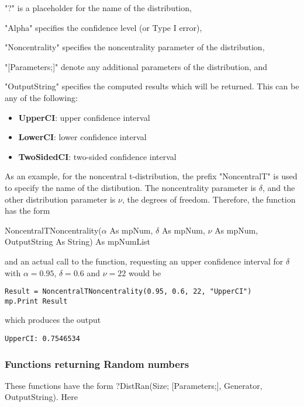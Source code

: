 "?" is a placeholder for the name of the distribution, 

"Alpha" specifies the confidence level (or Type I error), 

"Noncentrality" specifies the noncentrality parameter of the distribution, 

"[Parameters;]" denote any additional parameters of the distribution, and 

"OutputString" specifies the computed results which will be returned. This can be any of the following:

\begin{itemize}
	\item \textbf{UpperCI}: upper confidence interval
	\item \textbf{LowerCI}: lower confidence interval
	\item \textbf{TwoSidedCI}: two-sided confidence interval
\end{itemize}


\vspace{0.3cm}
As an example, for the noncentral  t-distribution, the prefix "NoncentralT" is used to specify the name of the distibution. The noncentrality parameter is $\delta$, and the other distribution parameter is $\nu$, the degrees of freedom.  Therefore, the function has the form

\vspace{0.3cm}
\textsf{NoncentralTNoncentrality($\alpha$ As mpNum, $\delta$ As mpNum, $\nu$ As mpNum, OutputString As String) As mpNumList}

\vspace{0.3cm}
and an actual call to the function, requesting an upper confidence interval for $\delta$ with $\alpha = 0.95$, $\delta = 0.6$ and $\nu=22$   would be

\begin{lstlisting}
Result = NoncentralTNoncentrality(0.95, 0.6, 22, "UpperCI")
mp.Print Result
\end{lstlisting}
which produces the output

\begin{verbatim}
UpperCI: 0.7546534
\end{verbatim}



\newpage
\subsubsection{Functions returning Random numbers}
\label{Functions returning Random numbers}
These functions have the form \textsf{?DistRan(Size; [Parameters;], Generator, OutputString)}.
Here 

